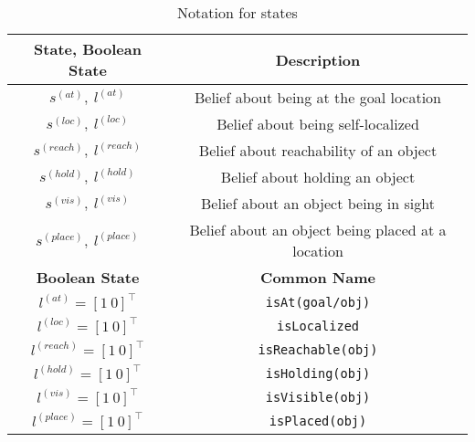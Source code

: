 \begin{table}[ht!]
\caption{Notation for states}%
\centering %
\begin{tabular}{c c} %
\toprule %
\textbf{State, Boolean State} & \textbf{Description}\\ [0.5ex] %
\midrule %
${s^{(at)}},\ {l^{(at)}}$ & Belief about being at the goal location \\
${s^{(loc)}},\ {l^{(loc)}}$ & Belief about being self-localized \\
${s^{(reach)}},\ {l^{(reach)}}$ & Belief about reachability of an object\\
${s^{(hold)}},\ {l^{(hold)}}$ & Belief about holding an object\\
${s^{(vis)}},\ {l^{(vis)}}$ & Belief about an object being in sight\\
${s^{(place)}},\ {l^{(place)}}$ & Belief about an object being placed at a location\\
\midrule
\textbf{Boolean State} & \textbf{Common Name}\\ [0.5ex] %
\midrule %
${l^{(at)}= [1\ 0]^\top}$ & \texttt{isAt(goal\slash obj)} \\
${l^{(loc)}= [1\ 0]^\top}$ & \texttt{isLocalized} \\
${l^{(reach)}= [1\ 0]^\top}$ & \texttt{isReachable(obj)}\\
${l^{(hold)}= [1\ 0]^\top}$ & \texttt{isHolding(obj)}\\
${l^{(vis)}= [1\ 0]^\top}$ & \texttt{isVisible(obj)}\\
${l^{(place)}= [1\ 0]^\top}$ & \texttt{isPlaced(obj)}\\
\bottomrule %
\end{tabular}
\label{tab:States}
\end{table}


